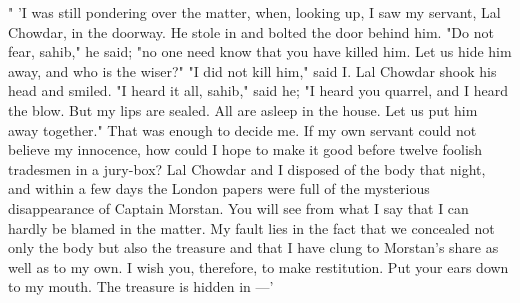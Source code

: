 \documentclass[a4paper,oneside,12pt]{amsart}
\begin{document}
{} \vspace{6mm} {\Large 

 
" 'I was still pondering over the matter, when, looking up, I saw my servant, Lal Chowdar, in the doorway. He stole in and bolted the door behind him. "Do not fear, sahib," he said; "no one need know that you have killed him. Let us hide him away, and who is the wiser?" "I did not kill him," said I. Lal Chowdar shook his head and smiled. "I heard it all, sahib," said he; "I heard you quarrel, and I heard the blow. But my lips are sealed. All are asleep in the house. Let us put him away together." That was enough to decide me. If my own servant could not believe my innocence, how could I hope to make it good before twelve foolish tradesmen in a jury-box? Lal Chowdar and I disposed of the body that night, and within a few days the London papers were full of the mysterious disappearance of Captain Morstan. You will see from what I say that I can hardly be blamed in the matter. My fault lies in the fact that we concealed not only the body but also the treasure and that I have clung to Morstan's share as well as to my own. I wish you, therefore, to make restitution. Put your ears down to my mouth. The treasure is hidden in ---'
\\ } 
\end{document}
